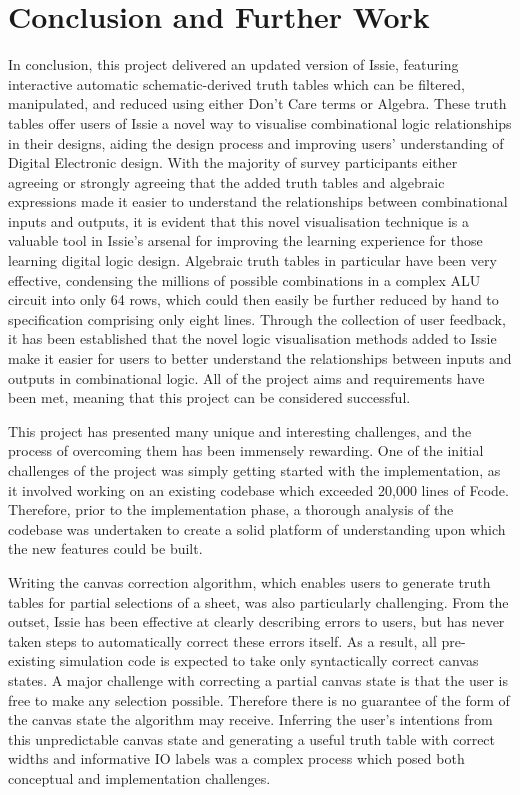 \chapter{Conclusion and Further Work}
In conclusion, this project delivered an updated version of Issie, featuring interactive automatic schematic-derived truth tables which can be filtered, manipulated, and reduced using either Don't Care terms or Algebra. These truth tables offer users of Issie a novel way to visualise combinational logic relationships in their designs, aiding the design process and improving users' understanding of Digital Electronic design. With the majority of survey participants either agreeing or strongly agreeing that the added truth tables and algebraic expressions made it easier to understand the relationships between combinational inputs and outputs, it is evident that this novel visualisation technique is a valuable tool in Issie's arsenal for improving the learning experience for those learning digital logic design. Algebraic truth tables in particular have been very effective, condensing the millions of possible combinations in a complex ALU circuit into only 64 rows, which could then easily be further reduced by hand to specification comprising only eight lines. Through the collection of user feedback, it has been established that the novel logic visualisation methods added to Issie make it easier for users to better understand the relationships between inputs and outputs in combinational logic. All of the project aims and requirements have been met, meaning that this project can be considered successful.

This project has presented many unique and interesting challenges, and the process of overcoming them has been immensely rewarding. One of the initial challenges of the project was simply getting started with the implementation, as it involved working on an existing codebase which exceeded 20,000 lines of F\fsharp code. Therefore, prior to the implementation phase, a thorough analysis of the codebase was undertaken to create a solid platform of understanding upon which the new features could be built.

Writing the canvas correction algorithm, which enables users to generate truth tables for partial selections of a sheet, was also particularly challenging. From the outset, Issie has been effective at clearly describing errors to users, but has never taken steps to automatically correct these errors itself. As a result, all pre-existing simulation code is expected to take only syntactically correct canvas states. A major challenge with correcting a partial canvas state is that the user is free to make any selection possible. Therefore there is no guarantee of the form of the canvas state the algorithm may receive. Inferring the user's intentions from this unpredictable canvas state and generating a useful truth table with correct widths and informative IO labels was a complex process which posed both conceptual and implementation challenges.


